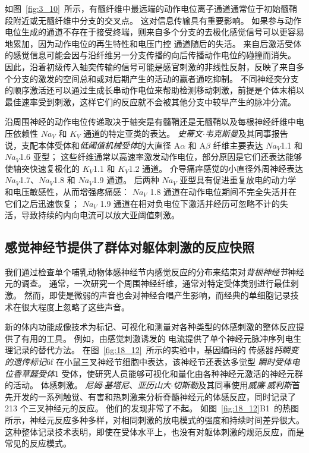 如图~\ref{fig:3_10}~所示，有髓纤维中最远端的动作电位离子通道通常位于初始髓鞘段附近或无髓纤维中分支的交叉点。
这对信息传输具有重要影响。
如果参与动作电位生成的通道不存在于接受终端，则来自多个分支的去极化感觉信号可以更容易地累加，因为动作电位的再生特性和电压门控  通道随后的失活。
来自后激活受体的感觉信息可能会因与沿纤维另一分支传播的向后传播动作电位的碰撞而消失。
因此，沿着初级传入轴突传输的信号可能是感官刺激的非线性反射，反映了来自多个分支的激发的空间总和或对后期产生的活动的赢者通吃抑制。
不同神经突分支的顺序激活还可以通过生成长串动作电位来帮助检测移动刺激，前提是个体末梢以最佳速率受到刺激，这样它们的反应就不会被其他分支中较早产生的脉冲分流。



沿周围神经的动作电位传递取决于轴突是有髓鞘还是无髓鞘以及每根神经纤维中电压依赖性 $Na_V$ 和 $K_V$ 通道的特定亚类的表达。
\textit{史蒂文$\cdot$韦克斯曼}及其同事报告说，支配本体受体和\textit{低阈值机械受体}的大直径 A$\alpha$ 和 A$\beta$ 纤维主要表达 $Na_V$1.1 和 $Na_V$1.6 亚型；
这些纤维通常以高速率激发动作电位，部分原因是它们还表达能够使轴突快速复极化的 $K_V$1.1 和 $K_V$1.2 通道。
介导痛痒感觉的小直径外周神经表达 $Na_V$1.7、$Na_V$1.8 和 $Na_V$1.9 通道。
后两种 $Na_V$ 亚型具有促进重复放电的动力学和电压敏感性，从而增强疼痛感：
$Na_V$ 1.8 通道在动作电位期间不完全失活并在它们之后迅速恢复； 
$Na_V$ 1.9 通道在相对负电位下激活并经历可忽略不计的失活，导致持续的内向电流可以放大亚阈值刺激。



\subsection{感觉神经节提供了群体对躯体刺激的反应快照}

我们通过检查单个哺乳动物体感神经节内感觉反应的分布来结束对\textit{背根神经节}神经元的调查。
通常，一次研究一个周围神经纤维，通常对特定受体类别进行最佳刺激。
然而，即使是微弱的声音也会对神经合唱产生影响，而经典的单细胞记录技术在很大程度上忽略了这些声音。


新的体内功能成像技术为标记、可视化和测量对各种类型的体感刺激的整体反应提供了有用的工具。
例如，由感觉刺激诱发的  电流提供了单个神经元脉冲序列电生理记录的替代方法。
在图~\ref{fig:18_12}~所示的实验中，基因编码的  传感器\textit{钙瞬变的遗传标记}6f 在小鼠三叉神经节细胞中表达，该神经节还表达多觉型 \textit{瞬时受体电位香草醛受体}1 受体，使研究人员能够可视化和量化由各种神经元激活的神经元群的活动。 体感刺激。
\textit{尼姆$\cdot$基塔尼}、\textit{亚历山大$\cdot$切斯勒}及其同事使用\textit{威廉$\cdot$威利斯}首先开发的一系列触觉、有害和热刺激来分析脊髓神经元的体感反应，同时记录了 213 个三叉神经元的反应。
他们的发现非常了不起。
如图~\ref{fig:18_12}B1~的热图所示，神经元反应多种多样，对相同刺激的放电模式的强度和持续时间差异很大。 
这种整体记录技术表明，即使在受体水平上，也没有对躯体刺激的规范反应，而是常见的反应模式。

